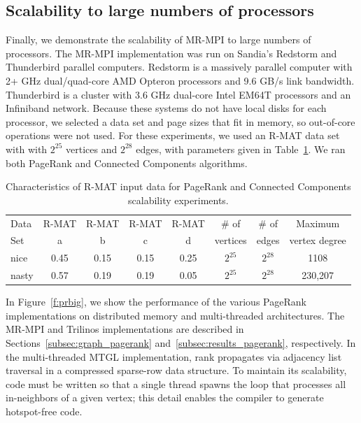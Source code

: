 \subsection{Scalability to large numbers of processors}
Finally, we demonstrate the scalability of MR-MPI to large numbers of 
processors.  
The MR-MPI implementation was run on Sandia's Redstorm and Thunderbird
parallel computers.  Redstorm is a massively parallel computer with 2+ 
{GHz} dual/quad-core AMD Opteron processors and 9.6 GB/s link bandwidth.
Thunderbird is a cluster with 3.6 {GHz} dual-core Intel EM64T processors
and an Infiniband network.
Because these systems do not have local disks for each processor, we selected 
a data set and page sizes that fit in memory, so out-of-core operations
were not used.  For these experiments, we used an R-MAT data set with 
with $2^{25}$ vertices and $2^{28}$ edges, with parameters given in
Table~\ref{t:rmat}.  We ran both PageRank and Connected Components
algorithms.

\begin{table}
\begin{center}
\begin{tabular}{|l|c|c|c|c|c|c|c|}
\hline
Data & R-MAT  & R-MAT  & R-MAT  & R-MAT  & \# of    & \# of & Maximum \\
Set  & a      & b      & c      & d      & vertices & edges & vertex degree\\
\hline
nice  & 0.45 & 0.15 & 0.15 & 0.25 & $2^{25}$ & $2^{28}$ & 1108 \\
nasty & 0.57 & 0.19 & 0.19 & 0.05 & $2^{25}$ & $2^{28}$ & 230,207\\
\hline
\end{tabular}
\caption{Characteristics of R-MAT input data for PageRank and Connected
Components scalability experiments.}
\label{t:rmat}
\end{center}
\end{table}

In Figure~\ref{f:prbig}, we show the performance 
of the various PageRank
implementations on distributed memory and multi-threaded architectures.
The MR-MPI and Trilinos implementations are described in 
Sections~\ref{subsec:graph_pagerank} and~\ref{subsec:results_pagerank},
respectively.
In the multi-threaded MTGL implementation,
rank propagates via adjacency list traversal
in a compressed sparse-row data structure.
To maintain its scalability, code must
be written so that a single thread spawns the loop that processes all
in-neighbors of a given vertex; this detail enables the compiler to generate
hotspot-free code.

